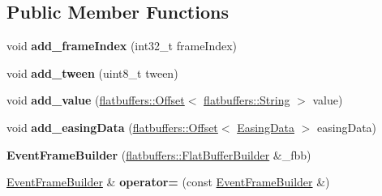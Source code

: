 \subsection*{Public Member Functions}
\begin{DoxyCompactItemize}
\item 
\mbox{\label{structflatbuffers_1_1EventFrameBuilder_ac5ae2f1f2a7a9b3da8f575480efb65f5}} 
void {\bfseries add\+\_\+frame\+Index} (int32\+\_\+t frame\+Index)
\item 
\mbox{\label{structflatbuffers_1_1EventFrameBuilder_a42b6e9e1508b5673278b8cbb19b084b3}} 
void {\bfseries add\+\_\+tween} (uint8\+\_\+t tween)
\item 
\mbox{\label{structflatbuffers_1_1EventFrameBuilder_adc12ab24bd514c0d5066cd4738681499}} 
void {\bfseries add\+\_\+value} (\hyperlink{structflatbuffers_1_1Offset}{flatbuffers\+::\+Offset}$<$ \hyperlink{structflatbuffers_1_1String}{flatbuffers\+::\+String} $>$ value)
\item 
\mbox{\label{structflatbuffers_1_1EventFrameBuilder_a1ddb5416873dce9450fc7b961f1e962b}} 
void {\bfseries add\+\_\+easing\+Data} (\hyperlink{structflatbuffers_1_1Offset}{flatbuffers\+::\+Offset}$<$ \hyperlink{structflatbuffers_1_1EasingData}{Easing\+Data} $>$ easing\+Data)
\item 
\mbox{\label{structflatbuffers_1_1EventFrameBuilder_a357d0f3714a7d7411d4c6c63f5615b15}} 
{\bfseries Event\+Frame\+Builder} (\hyperlink{classflatbuffers_1_1FlatBufferBuilder}{flatbuffers\+::\+Flat\+Buffer\+Builder} \&\+\_\+fbb)
\item 
\mbox{\label{structflatbuffers_1_1EventFrameBuilder_a8306ba7dcce0efe1dd90ee31ad4ea4d1}} 
\hyperlink{structflatbuffers_1_1EventFrameBuilder}{Event\+Frame\+Builder} \& {\bfseries operator=} (const \hyperlink{structflatbuffers_1_1EventFrameBuilder}{Event\+Frame\+Builder} \&)
\item 
\mbox{\label{structflatbuffers_1_1EventFrameBuilder_a07e7912370e13e260485af14f6e441fa}} 

\end{DoxyCompactItemize}
